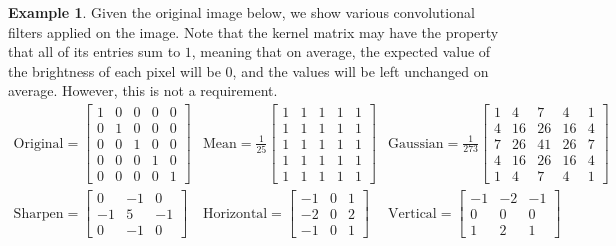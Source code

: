 \documentclass{article}
\theoremstyle{definition}
\newtheorem{example}{Example}[section]
\theoremstyle{remark}
\theoremstyle{definition}
\begin{document}
    \begin{example}
      Given the original image below, we show various convolutional filters applied on the image. Note that the kernel matrix may have the property that all of its entries sum to $1$, meaning that on average, the expected value of the brightness of each pixel will be $0$, and the values will be left unchanged on average. However, this is not a requirement.  
      \begin{align*}
        \mathrm{Original} = \begin{bmatrix} 1 & 0 & 0 & 0 & 0 \\ 0 & 1 & 0 & 0 & 0 \\ 0 & 0 & 1 & 0 & 0 \\ 0 & 0 & 0 & 1 & 0 \\ 0 & 0 & 0 & 0 & 1 \end{bmatrix} & 
        \mathrm{Mean} = \frac{1}{25} \begin{bmatrix} 1 & 1 & 1 & 1 & 1 \\ 1 & 1 & 1 & 1 & 1 \\ 1 & 1 & 1 & 1 & 1 \\ 1 & 1 & 1 & 1 & 1 \\ 1 & 1 & 1 & 1 & 1 \end{bmatrix} & 
        \mathrm{Gaussian} = \frac{1}{273} \begin{bmatrix} 1 & 4 & 7 & 4 & 1 \\ 4 & 16 & 26 & 16 & 4 \\ 7 & 26 & 41 & 26 & 7 \\ 4 & 16 & 26 & 16 & 4 \\ 1 & 4 & 7 & 4 & 1 \end{bmatrix} \\   
        \mathrm{Sharpen} = \begin{bmatrix} 0 & -1 & 0 \\ -1 & 5 & -1 \\ 0 & -1 & 0 \end{bmatrix} & 
        \mathrm{Horizontal} = \begin{bmatrix} -1 & 0 & 1 \\ -2 & 0 & 2 \\ -1 & 0 & 1 \end{bmatrix} & 
        \mathrm{Vertical} = \begin{bmatrix} -1 & -2 & -1 \\ 0 & 0 & 0 \\ 1 & 2 & 1 \end{bmatrix} 
      \end{align*}


\end{example}
\end{document}
